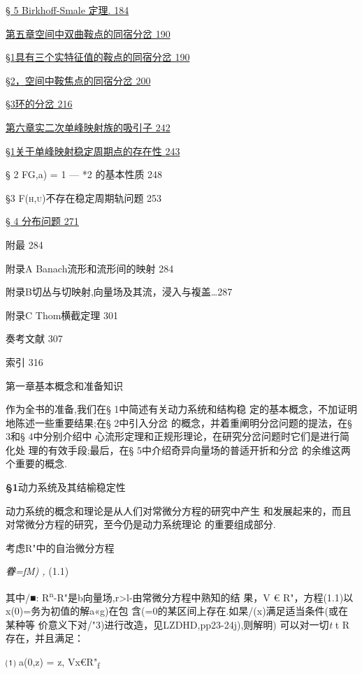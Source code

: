 \documentclass{article}
\begin{document}
\protect\hyperlink{bookmark225}{§ 5 Birkhoff-Smale 定理. 184}

\protect\hyperlink{bookmark236}{第五章空间中双曲鞍点的同宿分岔 190}

\protect\hyperlink{bookmark239}{§1具有三个实特征值的鞍点的同宿分岔 190}

\protect\hyperlink{bookmark268}{§2，空间中鞍焦点的同宿分岔 200}

\protect\hyperlink{bookmark278}{§3环的分岔 216}

\protect\hyperlink{bookmark348}{第六章实二次单峰映射族的吸引子 242}

\protect\hyperlink{bookmark351}{§1关于单峰映射稳定周期点的存在性 { }
243}

§ 2 FG,a) = 1 --- *2 的基本性质 248

§3 \textsc{F(h,u)}不存在稳定周期轨问题 253

\protect\hyperlink{bookmark395}{§ 4 分布问题 271}

附最 284

附录A Banach流形和流形间的映射 284

附录B切丛与切映射,向量场及其流，浸入与複盖\ldots{}287

附录C Thom横截定理 301

奏考文献 307

索引 316

\protect\hypertarget{bookmark6}{}{}第一章基本概念和准备知识

作为全书的准备,我们在§ 1中简述有关动力系统和结构稳
定的基本概念，不加证明地陈述一些重要结果;在§ 2中引入分岔
的概念，并着重阐明分岔问题的提法，在§ 3和§ 4中分别介绍中
心流形定理和正规形理论，在研究分岔问题时它们是进行简化处
理的有效手段;最后，在§ 5中介绍奇异向量场的普适开折和分岔
的余维这两个重要的概念.

\protect\hypertarget{bookmark10}{}{}\textbf{§1}动力系统及其结榆稳定性

动力系统的概念和理论是从人们对常微分方程的研究中产生
和发展起来的，而且对常微分方程的研究，至今仍是动力系统理论
的重要组成部分.

考虑R"中的自治微分方程

\emph{眷=fM) ,} (1.1)

其中/■:
R\textsuperscript{n}-R"是b向量场,r\textgreater{}l-由常微分方程中熟知的结
果，V € R"，方程(1.1)以x(0)=务为初值的解a«g)在包
含(=0的某区间上存在.如杲/(x)满足适当条件(或在某种等
价意义下对/"3)进行改造，见LZDHD,pp23-24j),则解明) 可以对一切\emph{t} t
R存在，并且满足：

⑴ a(0,z) = z, Vx€R"\textsubscript{f}
\end{document}
